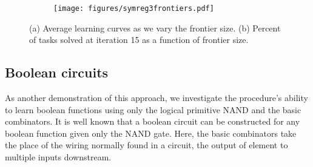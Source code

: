 \documentclass{article}
\begin{document}
\begin{figure}
\begin{subfigure}[Before]{.6\linewidth}
\texttt{[image: figures/symreg3frontiers.pdf]}
\end{subfigure}
\caption{(a) Average learning curves as we vary the frontier size. (b)
  Percent of tasks solved at iteration 15 as a function of frontier
  size.}
\label{fig:symreg} 
\end{figure}



\subsection{Boolean circuits}
\label{sec:boolcircuits}

As another demonstration of this approach, we investigate the
procedure's ability to learn boolean functions using only the logical
primitive NAND and the basic combinators. It is well known that a
boolean circuit can be constructed for any boolean function given only
the NAND gate. Here, the basic combinators take the place of the
wiring normally found in a circuit, the output of element to multiple
inputs downstream. 
\end{document}
